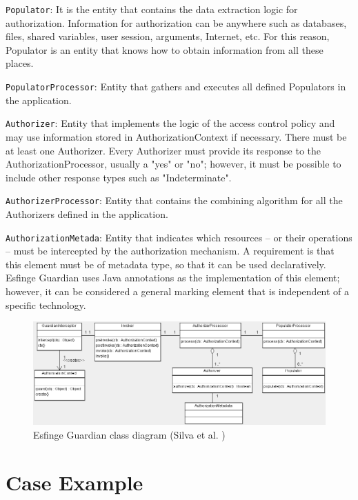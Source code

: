 \documentclass[sigconf]{acmart}
\begin{document}
\noindent \verb|Populator|: It is the entity that contains the data extraction logic for authorization. Information for authorization can be anywhere such as databases, files, shared variables, user session, arguments, Internet, etc. For this reason, Populator is an entity that knows how to obtain information from all these places.


\noindent \verb|PopulatorProcessor|: Entity that gathers and executes all defined Populators in the application.


\noindent \verb|Authorizer|: Entity that implements the logic of the access control policy and may use information stored in AuthorizationContext if necessary. There must be at least one Authorizer. Every Authorizer must provide its response to the AuthorizationProcessor, usually a "yes" or "no"; however, it must be possible to include other response types such as "Indeterminate".


\noindent \verb|AuthorizerProcessor|: Entity that contains the combining algorithm for all the Authorizers defined in the application.


\noindent \verb|AuthorizationMetada|: Entity that indicates which resources – or their operations – must be intercepted by the authorization mechanism. A requirement is that this element must be of metadata type, so that it can be used declaratively. Esfinge Guardian uses Java annotations as the implementation of this element; however, it can be considered a general marking element that is independent of a specific technology.



\begin{figure}
  \centering
  \includegraphics[scale=0.45]{img/guardian-class-diagram.png}
  \caption{Esfinge Guardian class diagram (Silva et al. \cite{Silva2013})}
  \label{fig:guardian-class-diagram}
\end{figure}


\section{Case Example}
\end{document}
